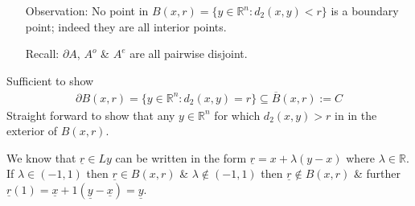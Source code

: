 \documentclass[10pt]{article}
\begin{document}
\begin{multicols}{2}

    \begin{itemize}
        \item[Observation:] No point in $B(x,r)=\{y\in\mathbb{R}^{n}:d_{2}(x,y)<r\}$ is a boundary point; indeed they are all interior points.
        \item[Recall:] $\partial A$, $A^{o}$ \& $A^{e}$ are all pairwise disjoint.
        
    \end{itemize}
    Sufficient to show
        \begin{align*}
            \boxed{\partial B(x,r)=\{y\in\mathbb{R}^{n}:d_{2}(x,y)=r\}\subseteq \overline{B}(x,r):=C}
        \end{align*}
    Straight forward to show that any $y\in\mathbb{R}^{n}$ for which $d_{2}(x,y)>r$ in in the exterior of $B(x,r)$.
\end{multicols}
We know that $\underline{r}\in Ly$ can be written in the form $\underline{r}=x+\lambda(y-x)$ where $\lambda\in\mathbb{R}$. If $\lambda\in(-1,1)$ then $\underline{r}\in B(x,r)$ \& $\lambda\notin(-1,1)$ then $\underline{r}\notin B(x,r)$ \& further $\underline{r}(1)=\underline{x}+1(\underline{y}-\underline{x})=\underline{y}$.
\end{document}
